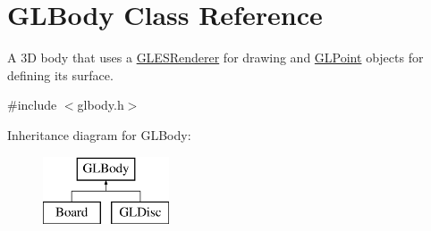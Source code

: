 \hypertarget{class_g_l_body}{}\section{G\+L\+Body Class Reference}
\label{class_g_l_body}


A 3D body that uses a \mbox{\hyperlink{class_g_l_e_s_renderer}{G\+L\+E\+S\+Renderer}} for drawing and \mbox{\hyperlink{class_g_l_point}{G\+L\+Point}} objects for defining its surface.  




{\ttfamily \#include $<$glbody.\+h$>$}

Inheritance diagram for G\+L\+Body\+:\begin{figure}[H]
\begin{center}
\leavevmode
\includegraphics[height=2.000000cm]{class_g_l_body}
\end{center}
\end{figure}
